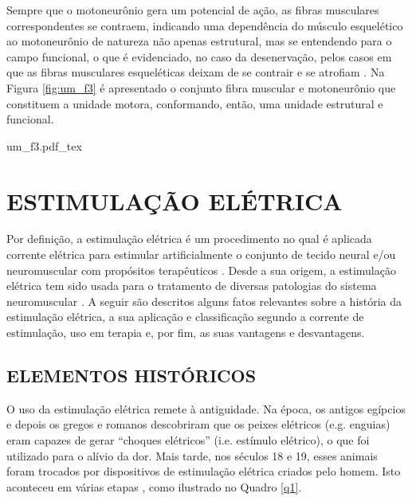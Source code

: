 Sempre que o motoneurônio gera um potencial de ação, as fibras musculares correspondentes se contraem, indicando uma dependência do músculo esquelético ao motoneurônio de natureza não apenas estrutural, mas se entendendo para o campo funcional, o que é evidenciado, no caso da desenervação, pelos casos em que as fibras musculares esqueléticas deixam de se contrair e se atrofiam \cite{JoseLopezChicharro2006}. Na Figura \ref{fig:um_f3} é apresentado o conjunto fibra muscular e motoneurônio que constituem a unidade motora, conformando, então, uma unidade estrutural e funcional.

\begin{figure*}[h]
    \centering %
    \small %
    \def\svgwidth{1\columnwidth}%
    {um_f3.pdf_tex}
    \caption{Unidades motoras (adaptado de \cite{JoseLopezChicharro2006}).}
    \label{fig:um_f3}
\end{figure*}

\section{ESTIMULAÇÃO ELÉTRICA}

Por definição, a estimulação elétrica é um procedimento no qual é aplicada corrente elétrica para estimular artificialmente o conjunto de tecido neural e/ou neuromuscular com propósitos terapêuticos \cite{Benjamin1978}. Desde a sua origem, a estimulação elétrica tem sido usada para o tratamento de diversas patologias do sistema neuromuscular \cite{Erick2002}. A seguir são descritos alguns fatos relevantes sobre a história da estimulação elétrica, a sua aplicação e classificação segundo a corrente de estimulação, uso em terapia e, por fim, as suas vantagens e desvantagens.

\subsection{ELEMENTOS HISTÓRICOS}
O uso da estimulação elétrica remete à antiguidade. Na época, os antigos egípcios e depois os gregos e romanos descobriram que os peixes elétricos (e.g. enguias) eram capazes de gerar “choques elétricos” (i.e. estímulo elétrico), o que foi utilizado para o alívio da dor. Mais tarde, nos séculos 18 e 19, esses animais foram trocados por dispositivos de estimulação elétrica criados pelo homem. Isto aconteceu em várias etapas \cite{Heidland2013}, como ilustrado no Quadro \ref{q1}. 

